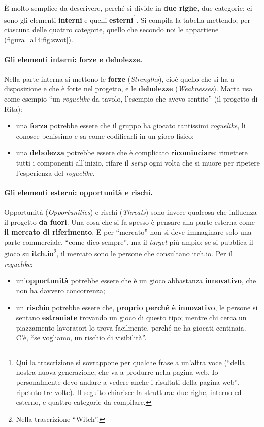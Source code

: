 È molto semplice da descrivere, perché si divide in \textbf{due righe}, due categorie: ci
sono gli elementi \textbf{interni} e quelli \textbf{esterni}\footnote{Qui la trascrizione si
sovrappone per qualche frase a un'altra voce (``della nostra nuova generazione, che va a
produrre nella pagina web. Io personalmente devo andare a vedere anche i risultati della
pagina web'', ripetuto tre volte). Il seguito chiarisce la struttura: due righe, interno ed
esterno, e quattro categorie da compilare.}. Si compila la tabella mettendo, per ciascuna
delle quattro categorie, quello che secondo noi le appartiene (figura~\ref{a14:fig:swot}).

\paragraph{Gli elementi interni: forze e debolezze.} Nella parte interna si mettono le
\textbf{forze} (\emph{Strengths}), cioè quello che si ha a disposizione e che è forte nel
progetto, e le \textbf{debolezze} (\emph{Weaknesses}). Marta usa come esempio ``un
\emph{roguelike} da tavolo, l'esempio che avevo sentito'' (il progetto di Rita):
\begin{itemize}
  \item una \textbf{forza} potrebbe essere che il gruppo ha giocato tantissimi
        \emph{roguelike}, li conosce benissimo e sa come codificarli in un gioco fisico;
  \item una \textbf{debolezza} potrebbe essere che è complicato \textbf{ricominciare}:
        rimettere tutti i componenti all'inizio, rifare il \emph{setup} ogni volta che si
        muore per ripetere l'esperienza del \emph{roguelike}.
\end{itemize}

\paragraph{Gli elementi esterni: opportunità e rischi.} Opportunità (\emph{Opportunities}) e
rischi (\emph{Threats}) sono invece qualcosa che influenza il progetto \textbf{da fuori}. Una
cosa che si fa spesso è pensare alla parte esterna come \textbf{il mercato di riferimento}.
E per ``mercato'' non si deve immaginare solo una parte commerciale, ``come dico sempre'', ma
il \emph{target} più ampio: se si pubblica il gioco su \textbf{itch.io}\footnote{Nella
trascrizione ``Witch''.}, il mercato sono le persone che consultano itch.io. Per il
\emph{roguelike}:
\begin{itemize}
  \item un'\textbf{opportunità} potrebbe essere che è un gioco abbastanza
        \textbf{innovativo}, che non ha davvero concorrenza;
  \item un \textbf{rischio} potrebbe essere che, \textbf{proprio perché è innovativo}, le
        persone si sentano \textbf{estraniate} trovando un gioco di questo tipo; mentre chi
        cerca un piazzamento lavoratori lo trova facilmente, perché ne ha giocati
        centinaia. C'è, ``se vogliamo, un rischio di visibilità''.
\end{itemize}

